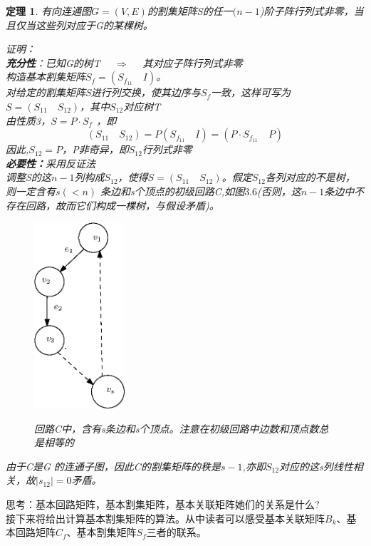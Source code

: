 \documentclass[11pt,a4paper,openany]{book}
\newcommand{\hwxw}{\CJKfamily{hwxw}}
\newcommand{\song}{\CJKfamily{song}}
\newtheorem{theorem}{\textbf{定理}}[section]
\begin{document}
\begin{theorem}
有向连通图$G=(V,E)$的割集矩阵S的任一$(n-1$)阶子阵行列式非零，当且仅当这些列对应于G的某棵树。\\
{\song
证明：\\
\textbf{充分性}：已知G的树T $\quad \Rightarrow \quad$ 其对应子阵行列式非零\\
构造基本割集矩阵$S_f=(S_{f_{11}} \quad I)$。\\
对给定的割集矩阵S进行列交换，使其边序与$S_f$一致，这样可写为$S=(S_{11} \quad S_{12})$，其中$S_{12}$对应树T\\
由性质3，$S=P\cdot S_f$ ，即$$(S_{11} \quad S_{12})=P(S_{f_{11}} \quad I)=(P\cdot S_{f_{11}} \quad P)$$
因此,$S_{12}=P$，P非奇异，即$S_{12}$行列式非零\\
\textbf{必要性：}采用反证法\\
调整S的这$n-1$列构成$S_{12}$，使得$S=(S_{11}\quad S_{12})$。假定$S_{12}$各列对应的不是树，则一定含有$s(<n)$
条边和s个顶点的初级回路C,如图$3.6$(否则，这$n-1$条边中不存在回路，故而它们构成一棵树，与假设矛盾)。
\begin{figure}[H]
  \centering
  \includegraphics[width=0.3\textwidth]{3_61.eps}\\
  \caption{回路C中，含有s条边和s个顶点。注意在初级回路中边数和顶点数总是相等的}
\end{figure}
由于C是G 的连通子图，因此C的割集矩阵的秩是$s-1$,亦即$S_{12}$对应的这s列线性相关，故$|s_{12}|=0$矛盾。
}
\end{theorem}
{\hwxw 思考：基本回路矩阵，基本割集矩阵，基本关联矩阵她们的关系是什么?}\\

\indent 接下来将给出计算基本割集矩阵的算法。从中读者可以感受基本关联矩阵$B_k$、基本回路矩阵$C_f$、基本割集矩阵$S_f$三者的联系。\\
\end{document}
